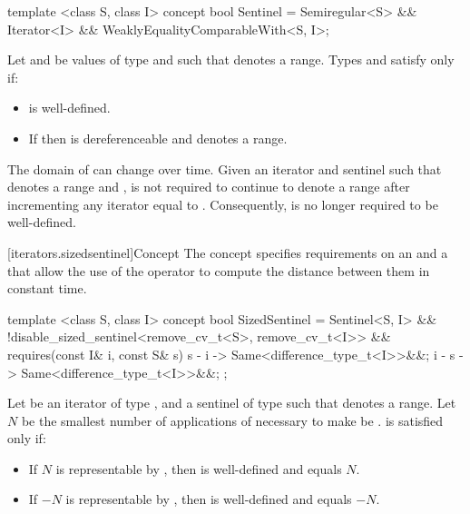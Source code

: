 %
\begin{itemdecl}
  template <class S, class I>
  concept bool Sentinel =
    Semiregular<S> &&
    Iterator<I> &&
    WeaklyEqualityComparableWith<S, I>;
\end{itemdecl}

\begin{itemdescr}
\pnum
Let  and  be values of type  and
 such that  denotes a range. Types
 and  satisfy  only if:

\begin{itemize}
\item {} is well-defined.

\item If  then  is dereferenceable and
       denotes a range.
\end{itemize}
\end{itemdescr}

\pnum
The domain of \tcode{==} can change over time.
Given an iterator  and sentinel  such that 
denotes a range and ,  is not required to continue to
denote a range after incrementing any iterator equal to . Consequently,
 is no longer required to be well-defined.

[iterators.sizedsentinel]{Concept }
\pnum
The  concept specifies
requirements on an  and a 
that allow the use of the \tcode{-} operator to compute the distance
between them in constant time.

%

\begin{itemdecl}
  template <class S, class I>
  concept bool SizedSentinel =
    Sentinel<S, I> &&
    !disable_sized_sentinel<remove_cv_t<S>, remove_cv_t<I>> &&
    requires(const I& i, const S& s) {
      { s - i } -> Same<difference_type_t<I>>&&;
      { i - s } -> Same<difference_type_t<I>>&&;
    };
\end{itemdecl}

\begin{itemdescr}
\pnum
Let  be an iterator of type , and 
a sentinel of type  such that  denotes a range.
Let $N$ be the smallest number of applications of 
necessary to make  be .
 is satisfied only if:

\begin{itemize}
\item If $N$ is representable by ,
      then  is well-defined and equals $N$.

\item If $-N$ is representable by ,
      then  is well-defined and equals $-N$.
\end{itemize}
\end{itemdescr}

